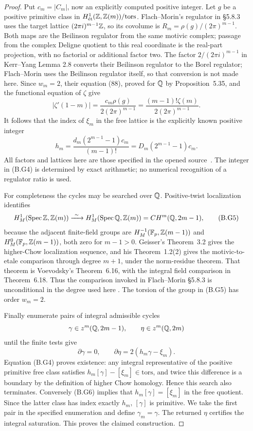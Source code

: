 \begin{proof}
Put \(c_m=|C_m|\), now an explicitly computed positive integer.
Let \(g\) be a positive primitive class in
\(H^1_{\mathrm{\acute et}}(\mathbb Z,\mathbb Z(m))/\mathrm{tors}\).
Flach--Morin's regulator in \S5.8.3 uses the target lattice
\((2\pi i)^{m-1}\mathbb Z\), so its covolume is
\(R_m=\rho(g)/(2\pi)^{m-1}\).  Both maps are the Beilinson
regulator from the same motivic complex; passage from the complex
Deligne quotient to this real coordinate is the real-part projection,
with no factorial or additional factor two.  The factor
\(2/(2\pi i)^{m-1}\) in Kerr--Yang Lemma 2.8 converts their
Beilinson regulator to the Borel regulator; Flach--Morin uses the
Beilinson regulator itself, so that conversion is not made here.
Since \(w_m=2\),
their equation (88), proved for \(\mathbb Q\) by Proposition~5.35,
and the functional equation of \(\zeta\) give
\[
 |\zeta'(1-m)|
 =\frac{c_m\rho(g)}{2(2\pi)^{m-1}}
 =\frac{(m-1)!\zeta(m)}{2(2\pi)^{m-1}}.
\]
It follows that the index of \(\xi_m\) in the free lattice is
the explicitly known positive integer
\[
 h_m=\frac{d_m(2^{m-1}-1)c_m}{(m-1)!}
     =D_m(2^{m-1}-1)c_m.
\tag{B.G4}
\]
All factors and lattices here are those specified in the opened
source~\cite[\S5.8.3, equation~(88), Proposition~5.35]{BFlachMorin2018}.
The integer in (B.G4) is determined by exact arithmetic; no numerical
recognition of a regulator ratio is used.

For completeness the cycles may be searched over \(\mathbb Q\).
Positive-twist localization identifies
\[
 H^1_M(\operatorname{Spec}\mathbb Z,\mathbb Z(m))
 \xrightarrow{\ \sim\ }
 H^1_M(\operatorname{Spec}\mathbb Q,\mathbb Z(m))=CH^m(\mathbb Q,2m-1),
\tag{B.G5}
\]
because the adjacent finite-field groups are
\(H^{-1}_M(\mathbb F_p,\mathbb Z(m-1))\) and
\(H^0_M(\mathbb F_p,\mathbb Z(m-1))\), both zero for \(m-1>0\).
Geisser's Theorem~3.2 gives the higher-Chow localization sequence,
and his Theorem~1.2(2) gives the motivic-to-etale comparison through
degree \(m+1\), under the norm-residue theorem.  That theorem is
Voevodsky's Theorem~6.16, with the integral field comparison in
Theorem~6.18.  Thus the comparison invoked in Flach--Morin
\S5.8.3 is unconditional in the degree used here
\cite[Theorems~1.2(2), 3.2]{BGeisserDedekind2004}
\cite[Theorems~6.16, 6.18]{BVoevodsky2011}.
The torsion of the group in (B.G5) has order \(w_m=2\).

Finally enumerate pairs of integral admissible cycles
\[
 \gamma\in z^m(\mathbb Q,2m-1),\qquad
 \eta\in z^m(\mathbb Q,2m)
\]
until the finite tests give
\[
 \partial\gamma=0,
 \qquad \partial\eta=2(h_m\gamma-\xi_m).
\tag{B.G6}
\]
Equation (B.G4) proves existence: any integral representative of the
positive primitive free class satisfies
\(h_m[\gamma]-[\xi_m]\in\mathrm{tors}\), and twice this
difference is a boundary by the definition of higher Chow homology.
Hence this search also terminates.  Conversely (B.G6) implies that
\(h_m[\gamma]=[\xi_m]\) in the free quotient.  Since the latter
class has index exactly \(h_m\), \([\gamma]\) is primitive.
We take the first pair in the specified enumeration and define
\(\gamma_m=\gamma\).  The returned \(\eta\) certifies the
integral saturation.  This proves the claimed construction.
\end{proof}

